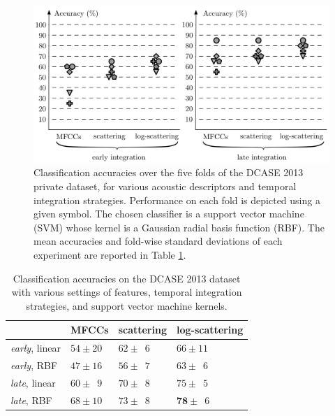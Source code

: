 \documentclass[journal]{IEEEtran}
\begin{document}
\begin{figure}
\begin{center}
\includegraphics[width=\columnwidth]{bw/folds.png}
\caption{\label{fig:folds}
Classification accuracies over the five folds of the DCASE 2013 private dataset, for various acoustic descriptors and temporal integration strategies.  Performance on each fold is depicted using a given symbol.
The chosen classifier is a support vector machine (SVM) whose kernel is a Gaussian radial basis function (RBF).
The mean accuracies and fold-wise standard deviations of each experiment are reported in Table \ref{table:dcase2013}.}
\end{center}
\end{figure}

\begin{table}
\begin{center}
\caption{
\label{table:dcase2013}
Classification accuracies on the DCASE 2013 dataset with various settings of features, temporal integration strategies, and support vector machine kernels.
}
\begin{tabular}{llll}
             & MFCCs         & scattering & log-scattering  \\
             \hline
\emph{early}, linear  & $54\pm20$   & $62\pm\phantom{0}6$  & $66\pm11$     \\
\emph{early}, RBF     & $47\pm16$  & $56\pm\phantom{0}7$  & $63\pm\phantom{0}6$   \\
\emph{late}, linear  & $60\pm\phantom{0}9$ & $70\pm\phantom{0}8$  & $75\pm\phantom{0}5$   \\
\emph{late}, RBF     & $68\pm10$ & $73\pm\phantom{0}8$  & $\mathbf{78}\pm\phantom{0}6$   \\
\end{tabular}
\end{center}
\end{table}
\end{document}
